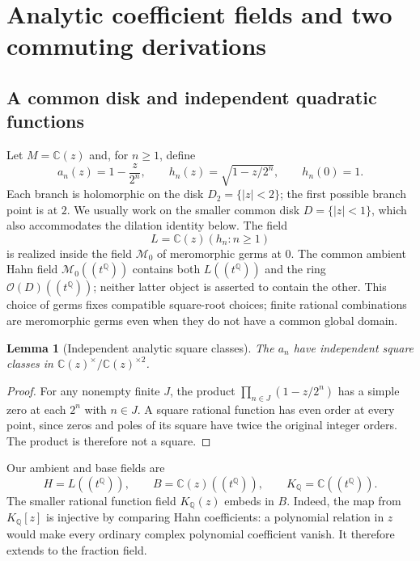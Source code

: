 \documentclass[11pt,a4paper]{article}
\numberwithin{equation}{section}
\newtheorem{lemma}[theorem]{Lemma}
\theoremstyle{definition}
\theoremstyle{remark}
\newcommand{\C}{\mathbb C}
\newcommand{\Q}{\mathbb Q}
\newcommand{\OO}{\mathcal O}
\begin{document}
\section{Analytic coefficient fields and two commuting derivations}\label{tail:sec:analyticsetup}

\subsection{A common disk and independent quadratic functions}
Let $M=\C(z)$ and, for $n\geq1$, define
\begin{equation}\label{tail:eq:hn}
 a_n(z)=1-\frac z{2^n},\qquad
 h_n(z)=\sqrt{1-z/2^n},\qquad h_n(0)=1.
\end{equation}
Each branch is holomorphic on the disk $D_2=\{|z|<2\}$; the first
possible branch point is at $2$. We usually work on the smaller common
disk $D=\{|z|<1\}$, which also accommodates the dilation identity below.
The field
\[
 L=\C(z)(h_n:n\geq1)
\]
is realized inside the field $\mathscr M_0$ of meromorphic germs at $0$.
The common ambient Hahn field $\mathscr M_0((t^\Q))$ contains both
$L((t^\Q))$ and the ring $\OO(D)((t^\Q))$; neither latter object is
asserted to contain the other. This choice of germs fixes compatible square-root choices; finite rational
combinations are meromorphic germs even when they do not have a common
global domain.

\begin{lemma}[Independent analytic square classes]\label{tail:lem:analyticclasses}
The $a_n$ have independent square classes in $\C(z)^\times/\C(z)^{\times2}$.
\end{lemma}
\begin{proof}
For any nonempty finite $J$, the product $\prod_{n\in J}(1-z/2^n)$ has
a simple zero at each $2^n$ with $n\in J$. A square rational function has
even order at every point, since zeros and poles of its square have twice
the original integer orders. The product is therefore not a square.
\end{proof}

Our ambient and base fields are
\begin{equation}\label{tail:eq:analyticfields}
 H=L((t^\Q)),\qquad B=\C(z)((t^\Q)),\qquad K_\Q=\C((t^\Q)).
\end{equation}
The smaller rational function field $K_\Q(z)$ embeds in $B$. Indeed,
the map from $K_\Q[z]$ is injective by comparing Hahn coefficients:
a polynomial relation in $z$ would make every ordinary complex polynomial
coefficient vanish. It therefore extends to the fraction field.
\end{document}
